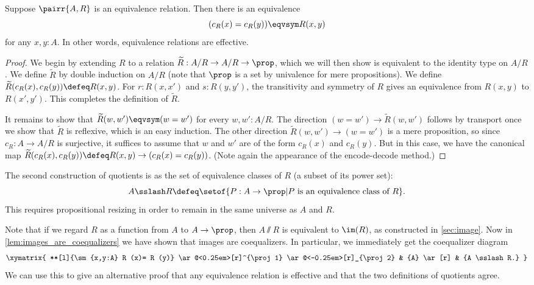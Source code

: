 \begin{lem}\label{lem:sets_exact}
Suppose $\pairr{A,R}$ is an equivalence relation. Then there is an equivalence
\begin{equation*}
(c_R(x)= c_R(y))\eqvsym R(x,y)
\end{equation*}
for any $x,y:A$. In other words, equivalence relations are effective.
\end{lem}

\begin{proof}
We begin by extending $R$ to a relation $\widetilde{R}:A/R\to A/R\to\prop$, which we will then show is equivalent
to the identity type on $A/R$. We define $\widetilde{R}$ by double induction on
$A/R$ (note that $\prop$ is a set by univalence for mere propositions). We
define $\widetilde{R}(c_R(x),c_R(y)) \defeq R(x,y)$. For $r:R(x,x')$ and $s:R(y,y')$,
the transitivity and symmetry
of $R$ gives an equivalence from $R(x,y)$ to $R(x',y')$. This completes the
definition of $\widetilde{R}$.

It remains to show that $\widetilde{R}(w,w')\eqvsym (w= w')$ for every $w,w':A/R$.
The direction $(w=w')\to \widetilde{R}(w,w')$ follows by transport once we show that $\widetilde{R}$ is reflexive, which is an easy induction.
The other direction $\widetilde{R}(w,w')\to (w= w')$ is a mere proposition, so since $c_R:A\to A/R$ is surjective, it suffices to assume that $w$ and $w'$ are of the form $c_R(x)$ and $c_R(y)$.
But in this case, we have the canonical map $\widetilde{R}(c_R(x),c_R(y)) \defeq R(x,y) \to (c_R(x)=c_R(y))$.
(Note again the appearance of the encode-decode method.)
\end{proof}

The second construction of quotients is as the set of equivalence classes of $R$ (a subset
of its power set):
\[ A\sslash R \defeq \setof{ P:A\to\prop | P \text{ is an equivalence class of } R}. \]
This requires propositional resizing in order to remain in the same universe as $A$ and $R$.

Note that if we regard $R$ as a function from $A$ to $A\to \prop$, then $A\sslash R$ is equivalent to $\im(R)$, as constructed in \cref{sec:image}.
Now in \cref{lem:images_are_coequalizers} we have shown that images are
coequalizers. In particular, we immediately get the coequalizer diagram
\begin{equation*}
  \xymatrix{
    **[l]{\sm{x,y:A} R (x)= R (y)}
    \ar@<0.25em>[r]^{\proj1}
    \ar@<-0.25em>[r]_{\proj2}
    &
    {A}
    \ar[r]
    &
    {A \sslash R.}
  }
\end{equation*}
We can use this to give an alternative proof that any equivalence relation is effective and that the two definitions of quotients agree.


